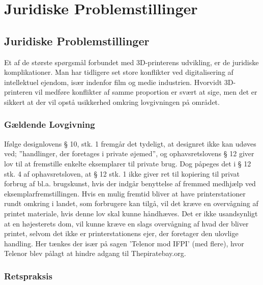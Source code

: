 \chapter{Juridiske Problemstillinger}

\section{Juridiske Problemstillinger}

Et af de største spørgsmål forbundet med 3D-printerens udvikling, er de juridiske komplikationer. Man har tidligere set store konflikter ved digitalisering af intellektuel ejendom, især indenfor film og medie industrien. Hvorvidt 3D-printeren vil medføre konflikter af samme proportion er svært at sige, men det er sikkert at der vil opstå usikkerhed omkring lovgivningen på området.

\subsection{Gældende Lovgivning}

Ifølge designlovens § 10, stk. 1 fremgår det tydeligt, at designret ikke kan udøves ved; ”handlinger, der foretages i private øjemed”\cite{jura1}, og ophavsretslovens § 12 giver lov til at fremstille enkelte eksemplarer til private brug. Dog påpeges det i § 12 stk. 4 af ophavsretsloven\cite{jura2}, at § 12 stk. 1 ikke giver ret til kopiering til privat forbrug af bl.a. brugskunst, hvis der indgår benyttelse af fremmed medhjælp ved eksemplarfremstillingen.
Hvis en mulig fremtid bliver at have printerstationer rundt omkring i landet\cite{jura3}, som forbrugere kan tilgå, vil det kræve en overvågning af printet materiale, hvis denne lov skal kunne håndhæves. Det er ikke usandsynligt at en højesterets dom, vil kunne kræve en slags overvågning af hvad der bliver printet, selvom det ikke er printerstationens ejer, der foretager den ulovlige handling. Her tænkes der især på sagen ’Telenor mod IFPI’ (med flere)\cite{jura4}, hvor Telenor blev pålagt at hindre adgang til Thepiratebay.org.

\subsection{Retspraksis}

